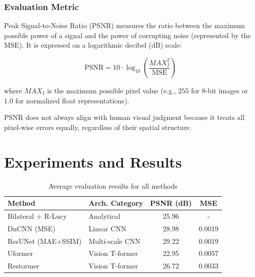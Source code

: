 \documentclass[conference]{IEEEtran}
\begin{document}
\subsubsection{Evaluation Metric}

Peak Signal-to-Noise Ratio (PSNR) measures the ratio between the maximum possible power of a signal
and the power of corrupting noise (represented by the MSE).
It is expressed on a logarithmic decibel (dB) scale:

$$
\text{PSNR} = 10 \cdot \log_{10} \left( \frac{MAX_I^2}{\text{MSE}} \right)
$$

where $MAX_I$ is the maximum possible pixel value
(e.g., $255$ for 8-bit images or $1.0$ for normalized float representations).

PSNR does not always align with human visual judgment
because it treats all pixel-wise errors equally,
regardless of their spatial structure. \cite{girod1993s}

\section{Experiments and Results}
\label{sec:experiments}

\begin{table}[tb]
  \centering
  \caption{Average evaluation results for all methods}
  \begin{tabular}{llcc}
    \hline
    \textbf{Method} & \textbf{Arch. Category} & \textbf{PSNR (dB)} & \textbf{MSE} \\
    \hline
    \hline
    Bilateral + R-Lucy & Analytical      & 25.96 & - \\
    DnCNN (MSE)        & Linear CNN      & 28.98 & 0.0019 \\
    ResUNet (MAE+SSIM) & Multi-scale CNN & 29.22 & 0.0019 \\
    Uformer            & Vision T-former & 22.95 & 0.0057 \\
    Restormer          & Vision T-former & 26.72 & 0.0033 \\
    \hline
  \end{tabular}%
\end{table}
\end{document}
